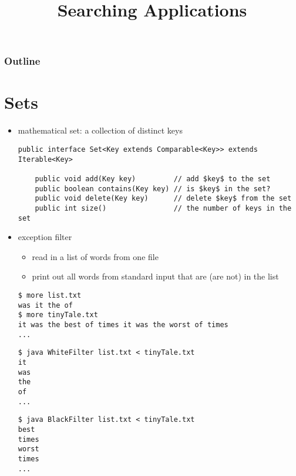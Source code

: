 \documentclass[8pt,a4paper,compress]{beamer}
\title{Searching Applications}
\date{}
\begin{document}
\begin{frame}
\vfill
\titlepage
\end{frame}

\begin{frame}
\frametitle{Outline}
\tableofcontents
\end{frame}

\section{Sets}
\begin{frame}[fragile]
\begin{itemize}
\item mathematical set: a collection of distinct keys
\begin{lstlisting}[language={},mathescape]
public interface Set<Key extends Comparable<Key>> extends Iterable<Key>

    public void add(Key key)         // add $key$ to the set
    public boolean contains(Key key) // is $key$ in the set?
    public void delete(Key key)      // delete $key$ from the set
    public int size()                // the number of keys in the set
\end{lstlisting}

\item exception filter
\begin{itemize}
\item read in a list of words from one file

\item print out all words from standard input that are (are not) in the list
\end{itemize}

\begin{lstlisting}[language={}]
$ more list.txt
was it the of
$ more tinyTale.txt
it was the best of times it was the worst of times
...
\end{lstlisting}

\begin{lstlisting}[language={}]
$ java WhiteFilter list.txt < tinyTale.txt 
it 
was 
the 
of 
...
\end{lstlisting}

\begin{lstlisting}[language={}]
$ java BlackFilter list.txt < tinyTale.txt
best 
times 
worst 
times
...
\end{lstlisting}
\end{itemize}
\end{frame}
\end{document}
